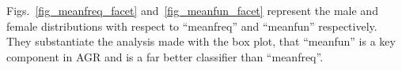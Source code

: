 Figs.~\ref{fig_meanfreq_facet} and~\ref{fig_meanfun_facet} represent the male and female distributions with respect to ``meanfreq'' and ``meanfun'' respectively. They substantiate the analysis made with the box plot, \ie{} that ``meanfun'' is a key component in AGR and is a far better classifier than ``meanfreq''.
